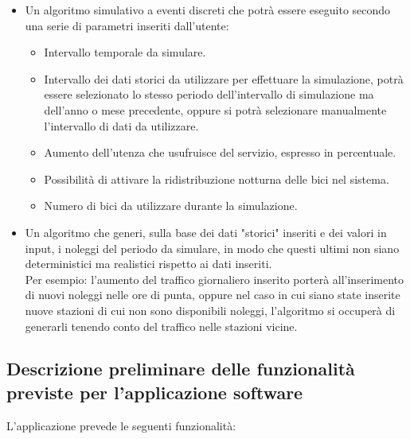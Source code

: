 \documentclass[a4paper, 12pt]{article}
\begin{document}
	\begin{itemize}
	\item Un algoritmo simulativo a eventi discreti che potrà essere eseguito secondo una serie di parametri inseriti dall'utente:
		\begin{itemize}
		\item Intervallo temporale da simulare.
		\item Intervallo dei dati storici da utilizzare per effettuare la simulazione, potrà essere selezionato lo stesso periodo dell'intervallo di simulazione ma dell'anno o mese precedente, oppure si potrà selezionare manualmente l'intervallo di dati da utilizzare.
		\item Aumento dell'utenza che usufruisce del servizio, espresso in percentuale.
		\item Possibilità di attivare la ridistribuzione notturna delle bici nel sistema.
		\item Numero di bici da utilizzare durante la simulazione.
		\end{itemize}
	\item Un algoritmo che generi, sulla base dei dati "storici" inseriti e dei valori in input, i noleggi del periodo da simulare, in modo che questi ultimi non siano deterministici ma realistici rispetto ai dati inseriti.\\
Per esempio: l'aumento del traffico giornaliero inserito porterà all'inserimento di nuovi noleggi nelle ore di punta, oppure nel caso in cui siano state inserite nuove stazioni di cui non sono disponibili noleggi, l'algoritmo si occuperà di generarli tenendo conto del traffico nelle stazioni vicine.
	\end{itemize}

	\subsection{Descrizione preliminare delle funzionalità previste per l’applicazione software}
	L'applicazione prevede le seguenti funzionalità:
\end{document}
